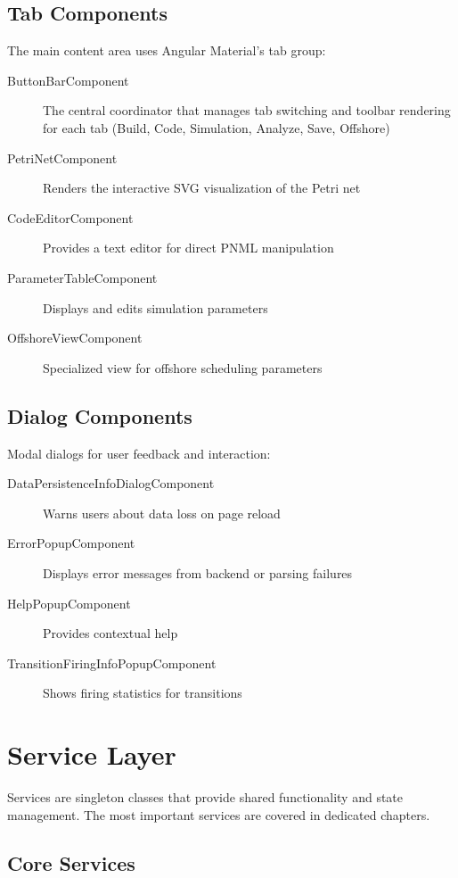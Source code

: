 \subsection{Tab Components}

The main content area uses Angular Material's tab group:

\begin{description}
    \item[ButtonBarComponent] The central coordinator that manages tab switching and toolbar rendering for each tab (Build, Code, Simulation, Analyze, Save, Offshore)
    \item[PetriNetComponent] Renders the interactive SVG visualization of the Petri net
    \item[CodeEditorComponent] Provides a text editor for direct PNML manipulation
    \item[ParameterTableComponent] Displays and edits simulation parameters
    \item[OffshoreViewComponent] Specialized view for offshore scheduling parameters
\end{description}

\subsection{Dialog Components}

Modal dialogs for user feedback and interaction:
\begin{description}
    \item[DataPersistenceInfoDialogComponent] Warns users about data loss on page reload
    \item[ErrorPopupComponent] Displays error messages from backend or parsing failures
    \item[HelpPopupComponent] Provides contextual help
    \item[TransitionFiringInfoPopupComponent] Shows firing statistics for transitions
\end{description}

\section{Service Layer}
\label{sec:service-layer}

Services are singleton classes that provide shared functionality and state management. The most important services are covered in dedicated chapters.

\subsection{Core Services}

